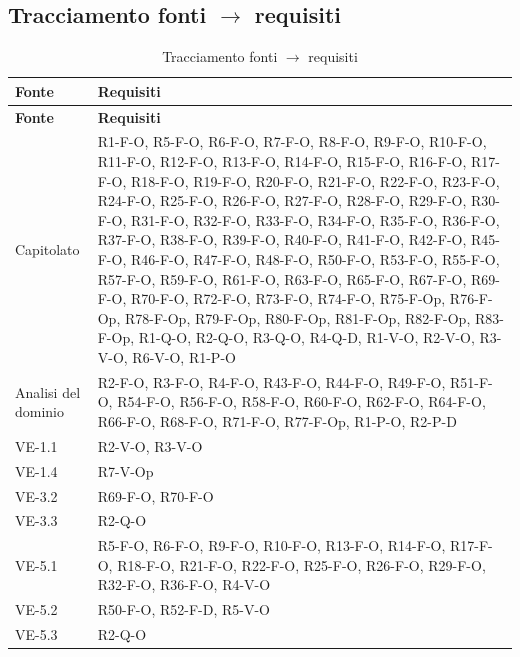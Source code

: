 \subsection{Tracciamento fonti $\rightarrow$ requisiti}
\begin{longtable}{|p{2.8cm}|p{10.2cm}|}
	\caption{Tracciamento fonti $\rightarrow$ requisiti} \\
	\hline
	\rowcolor{primarycolor!10}
	\textbf{Fonte} & \textbf{Requisiti} \\
	\hline
	\endfirsthead
	\hline
	\rowcolor{primarycolor!10}
	\textbf{Fonte} & \textbf{Requisiti} \\
	\hline
	\endhead

	Capitolato &
		R1-F-O, R5-F-O, R6-F-O, R7-F-O, R8-F-O,
		R9-F-O, R10-F-O, R11-F-O, R12-F-O,
		R13-F-O, R14-F-O, R15-F-O, R16-F-O,
		R17-F-O, R18-F-O, R19-F-O, R20-F-O,
		R21-F-O, R22-F-O, R23-F-O, R24-F-O,
		R25-F-O, R26-F-O, R27-F-O, R28-F-O,
		R29-F-O, R30-F-O, R31-F-O, R32-F-O,
		R33-F-O, R34-F-O, R35-F-O, R36-F-O,
		R37-F-O, R38-F-O, R39-F-O, R40-F-O,
		R41-F-O, R42-F-O, R45-F-O, R46-F-O,
		R47-F-O, R48-F-O, R50-F-O, R53-F-O,
		R55-F-O, R57-F-O, R59-F-O, R61-F-O,
		R63-F-O, R65-F-O, R67-F-O, R69-F-O,
		R70-F-O, R72-F-O, R73-F-O, R74-F-O,
		R75-F-Op, R76-F-Op, R78-F-Op, R79-F-Op,
		R80-F-Op, R81-F-Op, R82-F-Op, R83-F-Op,
		R1-Q-O, R2-Q-O, R3-Q-O, R4-Q-D,
		R1-V-O, R2-V-O, R3-V-O, R6-V-O,
		R1-P-O \\ \hline

	Analisi del dominio &
		R2-F-O, R3-F-O, R4-F-O, R43-F-O,
		R44-F-O, R49-F-O, R51-F-O, R54-F-O,
		R56-F-O, R58-F-O, R60-F-O, R62-F-O,
		R64-F-O, R66-F-O, R68-F-O, R71-F-O, R77-F-Op,
		R1-P-O, R2-P-D \\ \hline

	VE-1.1 & R2-V-O, R3-V-O \\ \hline
	VE-1.4 & R7-V-Op \\ \hline
	VE-3.2 & R69-F-O, R70-F-O \\ \hline
	VE-3.3 & R2-Q-O \\ \hline
	VE-5.1 &
		R5-F-O, R6-F-O, R9-F-O, R10-F-O,
		R13-F-O, R14-F-O, R17-F-O, R18-F-O,
		R21-F-O, R22-F-O, R25-F-O, R26-F-O,
		R29-F-O, R32-F-O, R36-F-O, R4-V-O \\ \hline
	VE-5.2 & R50-F-O, R52-F-D, R5-V-O \\ \hline
	VE-5.3 & R2-Q-O \\ \hline

\end{longtable}
